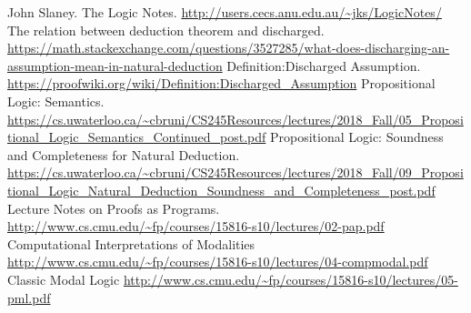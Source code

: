 \documentclass{article}
\theoremstyle{plain}
\theoremstyle{nonumberplain}
\begin{document}
\newpage
\begin{thebibliography}{00}
 John Slaney. The Logic Notes. \newline\url{http://users.cecs.anu.edu.au/~jks/LogicNotes/}
 The relation between deduction theorem and discharged. \newline\url{https://math.stackexchange.com/questions/3527285/what-does-discharging-an-assumption-mean-in-natural-deduction}
 Definition:Discharged Assumption. \newline\url{https://proofwiki.org/wiki/Definition:Discharged_Assumption}
 Propositional Logic: Semantics. \newline\url{https://cs.uwaterloo.ca/~cbruni/CS245Resources/lectures/2018_Fall/05_Propositional_Logic_Semantics_Continued_post.pdf}
 Propositional Logic: Soundness and
Completeness for Natural Deduction. 
\newline\url{https://cs.uwaterloo.ca/~cbruni/CS245Resources/lectures/2018_Fall/09_Propositional_Logic_Natural_Deduction_Soundness_and_Completeness_post.pdf}
 Lecture Notes on Proofs as Programs. \newline\url{http://www.cs.cmu.edu/~fp/courses/15816-s10/lectures/02-pap.pdf}
 Computational Interpretations of Modalities
\newline\url{http://www.cs.cmu.edu/~fp/courses/15816-s10/lectures/04-compmodal.pdf}
 Classic Modal Logic
\newline\url{http://www.cs.cmu.edu/~fp/courses/15816-s10/lectures/05-pml.pdf}
\end{thebibliography}
\end{document}
